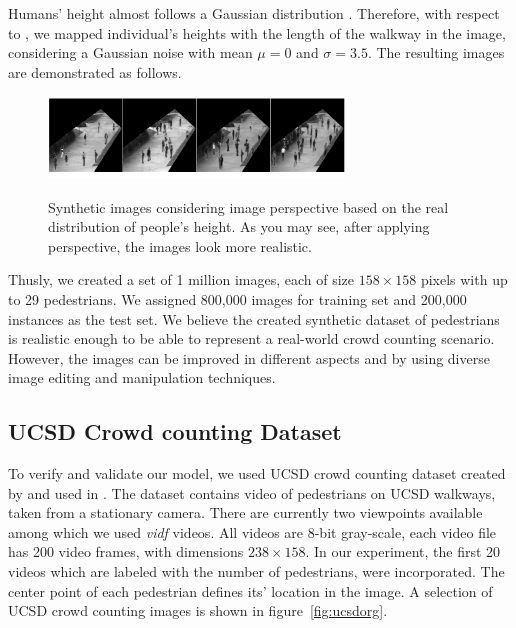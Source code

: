 \begin{itemize}
Humans' height almost follows a Gaussian distribution \cite{subramanian2011height}. Therefore, with respect to \cite{subramanian2011height, garcia2007evolution}, we mapped individual's heights with the length of the walkway in the image, considering a Gaussian noise with mean $\mu = 0$ and $\sigma = 3.5$. The resulting images are demonstrated as follows.

\begin{figure}[H]
	\centering
	{\includegraphics[width=0.7\textwidth]{images/pers}}
	\caption{Synthetic images considering image perspective based on the real distribution of people's height. As you may see, after applying perspective, the images look more realistic. }
	\label{fig:pers}
\end{figure}


\end{itemize}

\noindent Thusly, we created a set of 1 million images, each of size $158\times158$ pixels with up to 29 pedestrians. We assigned 800,000 images for training set and 200,000 instances as the test set. We believe the created synthetic dataset of pedestrians is realistic enough to be able to represent a real-world crowd counting scenario. However, the images can be improved in different aspects and by using diverse image editing and manipulation techniques. 

\subsection{UCSD Crowd counting Dataset}
\label{subsec:datareal2}
To verify and validate our model, we used UCSD crowd counting dataset created by \citeauthor*{chan2008privacy} and used in \cite{chan2008privacy,chan2009bayesian,chan2012counting}. The dataset contains video of pedestrians on UCSD walkways, taken from a stationary camera. There are currently two  viewpoints available among which we used \textit{vidf} videos. All videos are 8-bit gray-scale, each video file has 200 video frames, with dimensions $238\times158$. In our experiment, the first 20 videos which are labeled with the number of pedestrians, were incorporated. The center point of each pedestrian defines its' location in the image. A selection of UCSD crowd counting images is shown in figure~\ref{fig:ucsdorg}.

